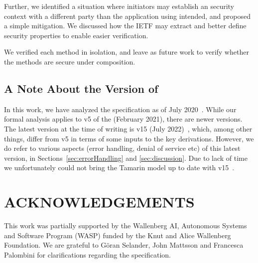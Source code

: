 \documentclass[runningheads]{llncs}
\begin{document}
Further, we identified a situation where initiators may establish an 
\mOscore{}
security context with a different party than the application using \mEdhoc{}
intended, and proposed a simple mitigation.
%
We discussed how the IETF may extract and better define security properties 
to
enable easier verification.

We verified each method in isolation, and leave as future work to verify 
whether
the methods are secure under composition.

\subsection{A Note About the Version of \mEdhoc}
\label{sec:newdrafts}
In this work, we have analyzed the \mEdhoc{} specification as of July
2020~\cite{our-analysis-selander-lake-edhoc-00}.
%
While our formal analysis applies to v5 of the \mSpec{} (February 2021),
there are newer versions.
%
The latest version at the time of writing is
v15 (July 2022)~\cite{draft-ietf-lake-edhoc-15}, which, among other things,
differ from v5 in terms of some inputs to the key derivations.
%
However, we do refer to various aspects
(error handling, denial of service etc) of this latest version,
in Sections~\ref{sec:errorHandling} and \ref{sec:discussion}.
%
Due to lack of time we unfortunately could not bring the Tamarin model up to
date with v15~\cite{draft-ietf-lake-edhoc-15}.
%

\section*{ACKNOWLEDGEMENTS}
This work was partially supported by
the Wallenberg AI, Autonomous Systems and Software Program (WASP) 
funded by
the Knut and Alice Wallenberg Foundation.
%
We are grateful to G\"oran Selander, John Mattsson and Francesca Palombini 
for
clarifications regarding the specification.
%


{\small
    
}
\end{document}
